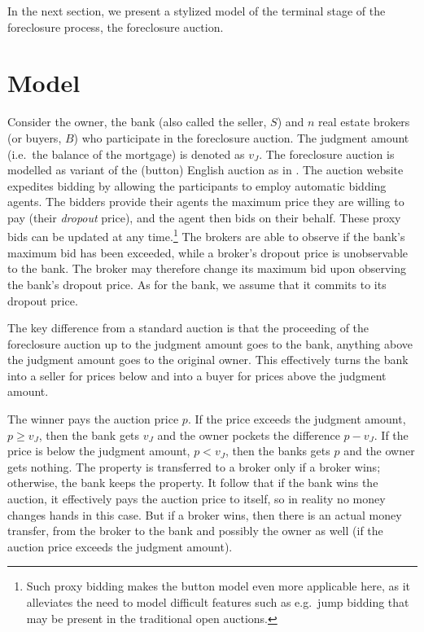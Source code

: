 \documentclass[11pt,twopage]{article}
\begin{document}
In the next section, we present a stylized model of the terminal stage
of the foreclosure process, the foreclosure auction.


\section{Model}

Consider the owner, the bank (also called the seller, $S$) and $n$
real estate brokers (or buyers, $B$) who participate in the
foreclosure auction. The judgment amount (i.e.\ the balance of the
mortgage) is denoted as $v_J$. The foreclosure auction is modelled as
variant of the (button) English auction as in
\cite{milgrom1982theory}. The auction website expedites bidding by
allowing the participants to employ automatic bidding agents. The
bidders provide their agents the maximum price they are willing to pay
(their \emph{dropout} price), and the agent then bids on their
behalf. These proxy bids can be updated at any time.\footnote{Such
  proxy bidding makes the button model even more applicable here, as
  it alleviates the need to model difficult features such as e.g.\
  jump bidding that may be present in the traditional open auctions.}
The brokers are able to observe if the bank's maximum bid has been
exceeded, while a broker's dropout price is unobservable to the
bank. The broker may therefore change its maximum bid upon observing
the bank's dropout price. As for the bank, we assume that it commits
to its dropout price.

The key difference from a standard auction is that the proceeding of
the foreclosure auction up to the judgment amount goes to the bank,
anything above the judgment amount goes to the original owner. This
effectively turns the bank into a seller for prices below and into a
buyer for prices above the judgment amount.

The winner pays the auction price $p$.  If the price exceeds the
judgment amount, $p\geq v_J$, then the bank gets $v_J$ and the owner
pockets the difference $p - v_J$. If the price is below the judgment
amount, $p<v_J$, then the banks gets $p$ and the owner gets
nothing. The property is transferred to a broker only if a broker
wins; otherwise, the bank keeps the property. It follow that if the
bank wins the auction, it effectively pays the auction price to
itself, so in reality no money changes hands in this case. But if a
broker wins, then there is an actual money transfer, from the broker
to the bank and possibly the owner as well (if the auction price
exceeds the judgment amount).
\end{document}
